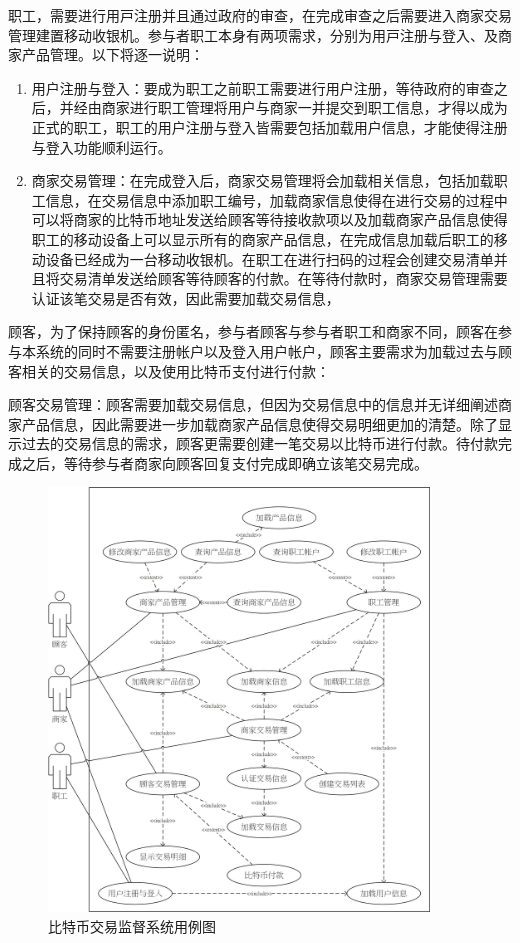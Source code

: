职⼯，需要进⾏⽤⼾注册并且通过政府的审查，在完成审查之后需要进⼊商家交易管理建置移动收银机。参与者职⼯本⾝有两项需求，分别为⽤⼾注册与登⼊、及商家产品管理。以下将逐⼀说明：


	\begin{enumerate}
	\item 用户注册与登入：要成为职工之前职工需要进行用户注册，等待政府的审查之后，并经由商家进行职工管理将用户与商家一并提交到职工信息，才得以成为正式的职工，职工的用户注册与登入皆需要包括加载用户信息，才能使得注册与登入功能顺利运行。
	\item 商家交易管理：在完成登入后，商家交易管理将会加载相关信息，包括加载职工信息，在交易信息中添加职工编号，加载商家信息使得在进行交易的过程中可以将商家的比特币地址发送给顾客等待接收款项以及加载商家产品信息使得职工的移动设备上可以显示所有的商家产品信息，在完成信息加载后职工的移动设备已经成为一台移动收银机。在职工在进行扫码的过程会创建交易清单并且将交易清单发送给顾客等待顾客的付款。在等待付款时，商家交易管理需要认证该笔交易是否有效，因此需要加载交易信息，
	\end{enumerate}

顾客，为了保持顾客的身份匿名，参与者顾客与参与者职工和商家不同，顾客在参与本系统的同时不需要注册帐户以及登入用户帐户，顾客主要需求为加载过去与顾客相关的交易信息，以及使用比特币支付进行付款：


顾客交易管理：顾客需要加载交易信息，但因为交易信息中的信息并无详细阐述商家产品信息，因此需要进一步加载商家产品信息使得交易明细更加的清楚。除了显示过去的交易信息的需求，顾客更需要创建一笔交易以⽐特币进⾏付款。待付款完成之后，等待参与者商家向顾客回复⽀付完成即确立该笔交易完成。

	\begin{figure}[!htbp]
	\centering
	\includegraphics[width = 0.9\textwidth]{UC.jpg}
	\caption{比特币交易监督系统⽤例图}\label{UC}
	\end{figure}

